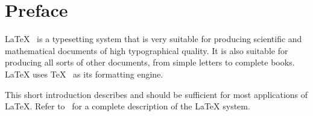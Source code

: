 %
%
%
%



\chapter{Preface}

\LaTeX{}~\cite{manual} is a typesetting system that is very
suitable for producing scientific and mathematical documents of high
typographical quality. It is also suitable for producing all
sorts of other documents, from simple letters to complete books.
\LaTeX{} uses \TeX{}~\cite{texbook} as its formatting engine.

This short introduction describes \LaTeXe{} and should be sufficient
for most applications of \LaTeX. Refer to~\cite{manual,companion} for
a complete description of the \LaTeX{} system.

